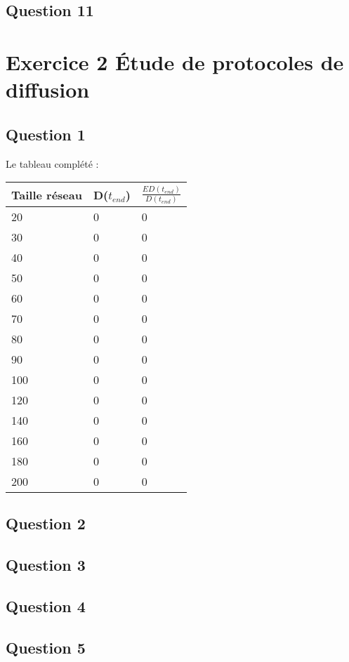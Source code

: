 \documentclass[10pt]{report}
\begin{document}
\subsection{Question 11}
\newpage
\section{Exercice 2  Étude de protocoles de diffusion}
\subsection{Question 1}
Le tableau complété :\\

\begin{center}
\begin{tabular}{|l|l|l|}
  \hline
  Taille réseau & D($t_{end}$) & $\frac{ED(t_{end})}{D(t_{end})}$\\
  \hline
	20 & 0 & 0\\
  \hline
  	30 & 0 & 0\\
  \hline
  	40 & 0 & 0\\
  \hline
  	50 & 0 & 0\\
  \hline
  	60 & 0 & 0\\
  \hline
  	70 & 0 & 0\\
  \hline
        80 & 0 & 0\\
  \hline
  	90 & 0 & 0\\
  \hline
  	100 & 0 & 0\\
  \hline
  	120 & 0 & 0\\
  \hline
  	140 & 0 & 0\\
  \hline
  	160 & 0 & 0\\
  \hline
  	180 & 0 & 0\\
  \hline
  	200 & 0 & 0\\
  \hline
\end{tabular}
\end{center}

\subsection{Question 2}
\subsection{Question 3}
\subsection{Question 4}
\subsection{Question 5}
\end{document}
